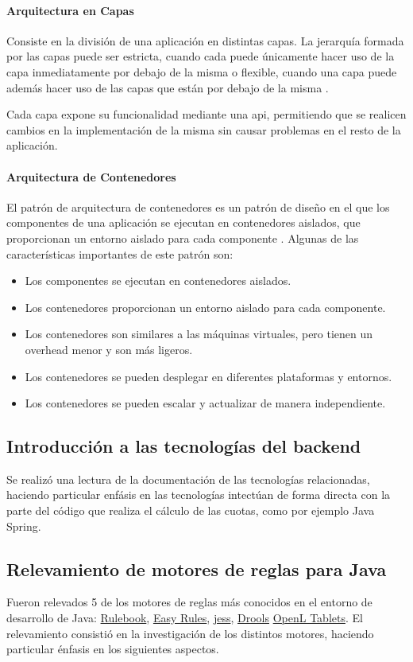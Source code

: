 \paragraph{Arquitectura en Capas}
Consiste en la división de una aplicación en distintas capas. La jerarquía formada por las capas puede ser estricta, cuando cada puede únicamente hacer uso de la capa inmediatamente por debajo de la misma o flexible, cuando una capa puede además hacer uso de las capas que están por debajo de la misma \cite{gommaModeling}.

Cada capa expone su funcionalidad mediante una \acrshort{api}, permitiendo que se realicen cambios en la implementación de la misma sin causar problemas en el resto de la aplicación.

\paragraph{Arquitectura de Contenedores}
El patrón de arquitectura de contenedores es un patrón de diseño en el que los componentes de una aplicación se ejecutan en contenedores aislados, que proporcionan un entorno aislado para cada componente \cite{dockerUpRunning}. Algunas de las características importantes de este patrón son:
\begin{itemize}
    \item Los componentes se ejecutan en contenedores aislados.
    \item Los contenedores proporcionan un entorno aislado para cada
componente.
    \item Los contenedores son similares a las máquinas virtuales, pero tienen
un overhead menor y son más ligeros.
    \item Los contenedores se pueden desplegar en diferentes plataformas y
entornos.
    \item Los contenedores se pueden escalar y actualizar de manera
independiente.
\end{itemize}

\subsection{Introducción a las tecnologías del backend}
Se realizó una lectura de la documentación de las tecnologías relacionadas, haciendo particular enfásis en las tecnologías intectúan de forma directa con la parte del código que realiza el cálculo de las cuotas, como por ejemplo Java Spring.

\subsection{Relevamiento de motores de reglas para Java}\label{para:motores}
Fueron relevados 5 de los motores de reglas más conocidos en el entorno de desarrollo de Java: \href{https://github.com/deliveredtechnologies/rulebook}{Rulebook}, \href{https://github.com/j-easy/easy-rules}{Easy Rules}, \href{http://alvarestech.com/temp/fuzzyjess/Jess60/Jess70b7/docs/index.html}{jess}, \href{https://www.drools.org/}{Drools} \href{https://openl-tablets.org/}{OpenL Tablets}. El relevamiento consistió en la investigación de los distintos motores, haciendo particular énfasis en los siguientes aspectos.

